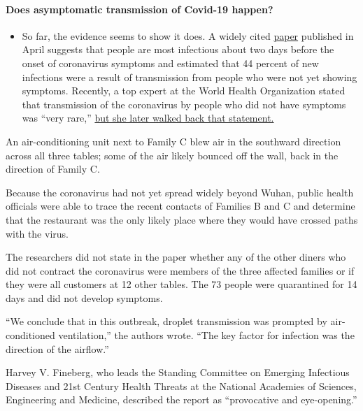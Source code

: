 \begin{itemize}
{  \paragraph{Does asymptomatic transmission of Covid-19
  happen?}\label{does-asymptomatic-transmission-of-covid-19-happen}}

  \begin{itemize}
  \tightlist
  \item
    So far, the evidence seems to show it does. A widely cited
    \href{https://www.nature.com/articles/s41591-020-0869-5}{paper}
    published in April suggests that people are most infectious about
    two days before the onset of coronavirus symptoms and estimated that
    44 percent of new infections were a result of transmission from
    people who were not yet showing symptoms. Recently, a top expert at
    the World Health Organization stated that transmission of the
    coronavirus by people who did not have symptoms was ``very rare,''
    \href{https://www.nytimes.com/2020/06/09/world/coronavirus-updates.html?action=click\&pgtype=Article\&state=default\&region=MAIN_CONTENT_3\&context=storylines_faq\#link-1f302e21}{but
    she later walked back that statement.}
  \end{itemize}
\end{itemize}

An air-conditioning unit next to Family C blew air in the southward
direction across all three tables; some of the air likely bounced off
the wall, back in the direction of Family C.

Because the coronavirus had not yet spread widely beyond Wuhan, public
health officials were able to trace the recent contacts of Families B
and C and determine that the restaurant was the only likely place where
they would have crossed paths with the virus.

The researchers did not state in the paper whether any of the other
diners who did not contract the coronavirus were members of the three
affected families or if they were all customers at 12 other tables. The
73 people were quarantined for 14 days and did not develop symptoms.

``We conclude that in this outbreak, droplet transmission was prompted
by air-conditioned ventilation,'' the authors wrote. ``The key factor
for infection was the direction of the airflow.''

Harvey V. Fineberg, who leads the Standing Committee on Emerging
Infectious Diseases and 21st Century Health Threats at the National
Academies of Sciences, Engineering and Medicine, described the report as
``provocative and eye-opening.''

